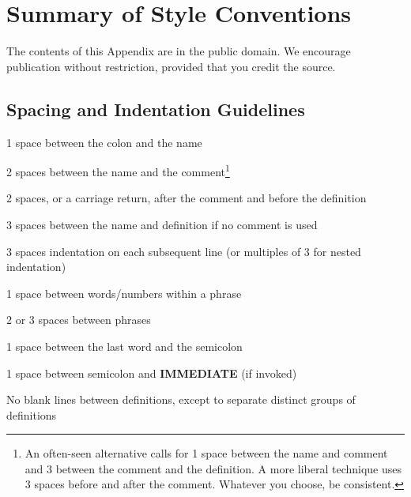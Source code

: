 \chapter{
Summary of
Style Conventions
}
The contents of this Appendix are in the public domain. We encourage
publication without restriction, provided that you credit the source.
\section{Spacing and Indentation Guidelines}
\begin{list}
{}{\setlength{\parsep}{0cm}}
\item 1 space between the colon and the name
\item 2 spaces between the name and the comment\footnote{
An often-seen alternative calls for 1 space between the name and comment and 3 between
the comment and the definition. A more liberal technique uses 3 spaces before and after the
comment. Whatever you choose, be consistent.
}
\item 2 spaces, or a carriage return, after the comment and before the definition\footnotemark[1]
\item 3 spaces between the name and definition if no comment is used
\item 3 spaces indentation on each subsequent line (or multiples of 3 for nested indentation)
\item 1 space between words/numbers within a phrase
\item 2 or 3 spaces between phrases
\item 1 space between the last word and the semicolon
\item 1 space between semicolon and {\bf IMMEDIATE} (if invoked)
\end{list}
No blank lines between definitions, except to separate distinct groups of
definitions

\vfill\pagebreak
